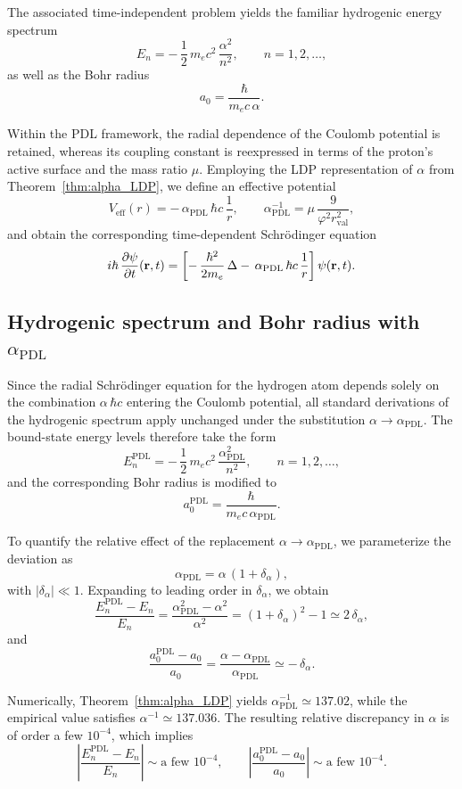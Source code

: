 \documentclass[11pt,a4paper]{article}
\theoremstyle{plain}
\theoremstyle{definition}
\theoremstyle{remark}
\begin{document}
The associated time-independent problem yields the familiar hydrogenic energy spectrum
\[
  E_n = -\,\frac{1}{2}\,m_e c^2\,\frac{\alpha^2}{n^2},
  \qquad n = 1,2,\dots,
\]
as well as the Bohr radius
\[
  a_0 = \frac{\hbar}{m_e c\,\alpha}.
\]

Within the PDL framework, the radial dependence of the Coulomb potential is retained, whereas its coupling constant is reexpressed in terms of the proton’s active surface and the mass ratio \(\mu\). Employing the LDP representation of \(\alpha\) from Theorem~\ref{thm:alpha_LDP}, we define an effective potential
\[
  V_{\mathrm{eff}}(r)
  = -\,\alpha_{\mathrm{PDL}}\,\hbar c\,\frac{1}{r},
  \qquad
  \alpha_{\mathrm{PDL}}^{-1}
  = \mu\,\frac{9}{\varphi^2 r_{\mathrm{val}}^2},
\]
and obtain the corresponding time-dependent Schrödinger equation
\[
  i\hbar\,\frac{\partial \psi}{\partial t}(\vb{r},t)
  =
  \left[
    -\,\frac{\hbar^2}{2m_e}\,\Delta
    -\,\alpha_{\mathrm{PDL}}\,\hbar c\,\frac{1}{r}
  \right] \psi(\vb{r},t).
\]

\subsection{Hydrogenic spectrum and Bohr radius with \texorpdfstring{\(\alpha_{\mathrm{PDL}}\)}{alpha\_PDL}}

Since the radial Schrödinger equation for the hydrogen atom depends solely on the combination \(\alpha\,\hbar c\) entering the Coulomb potential, all standard derivations of the hydrogenic spectrum apply unchanged under the substitution \(\alpha \to \alpha_{\mathrm{PDL}}\). The bound-state energy levels therefore take the form
\[
  E_n^{\mathrm{PDL}}
  = -\,\frac{1}{2}\,m_e c^2\,\frac{\alpha_{\mathrm{PDL}}^2}{n^2},
  \qquad n = 1,2,\dots,
\]
and the corresponding Bohr radius is modified to
\[
  a_0^{\mathrm{PDL}}
  = \frac{\hbar}{m_e c\,\alpha_{\mathrm{PDL}}}.
\]

To quantify the relative effect of the replacement \(\alpha \to \alpha_{\mathrm{PDL}}\),
we parameterize the deviation as
\[
  \alpha_{\mathrm{PDL}} = \alpha\,(1 + \delta_\alpha),
\]
with \(|\delta_\alpha| \ll 1\). Expanding to leading order in \(\delta_\alpha\), we obtain
\[
  \frac{E_n^{\mathrm{PDL}} - E_n}{E_n}
  = \frac{\alpha_{\mathrm{PDL}}^2 - \alpha^2}{\alpha^2}
  = (1 + \delta_\alpha)^2 - 1
  \simeq 2\,\delta_\alpha,
\]
and
\[
  \frac{a_0^{\mathrm{PDL}} - a_0}{a_0}
  = \frac{\alpha - \alpha_{\mathrm{PDL}}}{\alpha_{\mathrm{PDL}}}
  \simeq -\,\delta_\alpha.
\]

Numerically, Theorem~\ref{thm:alpha_LDP} yields \(\alpha_{\mathrm{PDL}}^{-1} \simeq 137.02\), while the empirical value satisfies \(\alpha^{-1} \simeq 137.036\). The resulting relative discrepancy in \(\alpha\) is of order a few \(10^{-4}\), which implies
\[
  \left| \frac{E_n^{\mathrm{PDL}} - E_n}{E_n} \right|
  \sim \text{a few } 10^{-4},
  \qquad
  \left| \frac{a_0^{\mathrm{PDL}} - a_0}{a_0} \right|
  \sim \text{a few } 10^{-4}.
\]
\end{document}
